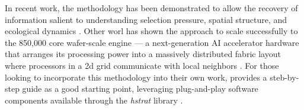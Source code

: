 In recent work, the methodology has been demonstrated to allow the recovery of information salient to understanding selection pressure, spatial structure, and ecological dynamics \citep{moreno2024ecology}.
Other worl has shown the approach to scale successfully to the 850,000 core wafer-scale engine --- a next-generation AI accelerator hardware that arranges its processing power into a massively distributed fabric layout where processors in a 2d grid communicate with local neighbors \citep{moreno2024trackable}.
For those looking to incorporate this methodology into their own work, \citet{moreno2024guide} provides a steb-by-step guide as a good starting point, leveraging plug-and-play software components available through the \textit{hstrat} library \citep{moreno2022hstrat}.

